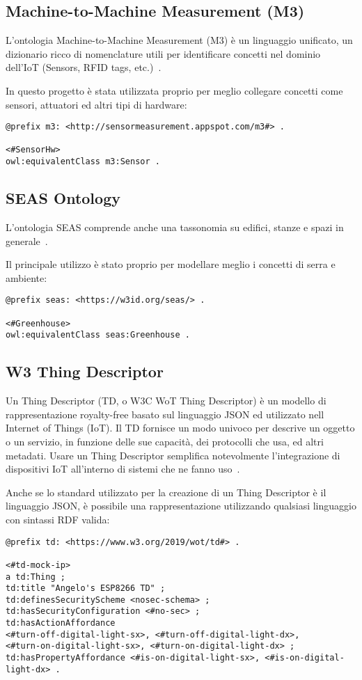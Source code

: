 \subsection{Machine-to-Machine Measurement (M3)}
L'ontologia Machine-to-Machine Measurement (M3) è un linguaggio unificato, un dizionario ricco di nomenclature utili per identificare concetti nel dominio dell'IoT (Sensors, RFID tags, etc.)~\cite{SWoTSema18:online}.

\noindent In questo progetto è stata utilizzata proprio per meglio collegare concetti come sensori, attuatori ed altri tipi di hardware:

\begin{verbatim}
@prefix m3: <http://sensormeasurement.appspot.com/m3#> .

<#SensorHw>
owl:equivalentClass m3:Sensor .
\end{verbatim}

\subsection{SEAS Ontology}
L'ontologia SEAS comprende anche una tassonomia su edifici, stanze e spazi in generale~\cite{SEAS:online}.

\noindent Il principale utilizzo è stato proprio per modellare meglio i concetti di serra e ambiente:

\begin{verbatim}
@prefix seas: <https://w3id.org/seas/> .

<#Greenhouse>
owl:equivalentClass seas:Greenhouse .
\end{verbatim}

\subsection{W3 Thing Descriptor}
Un Thing Descriptor (TD, o W3C WoT Thing Descriptor) è un modello di rappresentazione royalty-free basato sul linguaggio JSON ed utilizzato nell Internet of Things (IoT). Il TD fornisce un modo univoco per descrive un oggetto o un servizio, in funzione delle sue capacità, dei protocolli che usa, ed altri metadati. Usare un Thing Descriptor semplifica notevolmente l’integrazione di dispositivi IoT all’interno di sistemi che ne fanno uso~\cite{ThingDes54:online}.

\noindent Anche se lo standard utilizzato per la creazione di un Thing Descriptor è il linguaggio JSON, è possibile una rappresentazione utilizzando qualsiasi linguaggio con sintassi RDF valida:
\begin{verbatim}
@prefix td: <https://www.w3.org/2019/wot/td#> .

<#td-mock-ip>
a td:Thing ;
td:title "Angelo's ESP8266 TD" ;
td:definesSecurityScheme <nosec-schema> ;
td:hasSecurityConfiguration <#no-sec> ;
td:hasActionAffordance
<#turn-off-digital-light-sx>, <#turn-off-digital-light-dx>,
<#turn-on-digital-light-sx>, <#turn-on-digital-light-dx> ;
td:hasPropertyAffordance <#is-on-digital-light-sx>, <#is-on-digital-light-dx> .
\end{verbatim}
